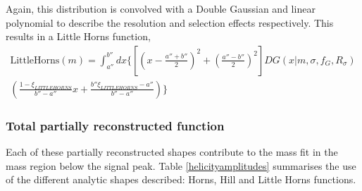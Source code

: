 Again, this distribution is convolved with a Double Gaussian and linear polynomial to describe the resolution and selection effects respectively. This results in a Little Horns function,
\begin{multline}
\text{LittleHorns}(m) = \int_{a''}^{b''} dx \biggl\{ \left[ \left( x - \frac{a''+b''}{2} \right) ^2 + \left( \frac{a''-b''}{2} \right) ^2 \right] DG(x|m,\sigma,f_G,R_{\sigma}) \\
\left( \frac{1 - \xi_{LITTLEHORNS}}{b'' - a''}x + \frac{b''\xi_{LITTLEHORNS} - a''}{b'' - a''} \right) \biggr\}
\label{eqn:littlehorns}
\end{multline}

\subsubsection{Total partially reconstructed function}

Each of these partially reconstructed shapes contribute to the mass fit in the \Bm mass region below the signal peak. Table \ref{helicityamplitudes} summarises the use of the different analytic shapes described: Horns, Hill and Little Horns functions. 

\begin{table}[h]
\centering
{}
\caption{Different partially reconstructed shapes and \Dstar helicity states and how this relates to the dependence on the helicity angle and the \B mass parameterisation. The kinematic endpoints $a_i$ and $b_i$ are allowed to be different for each of the partially reconstructed shapes.}
\label{helicityamplitudes}
\end{table}

